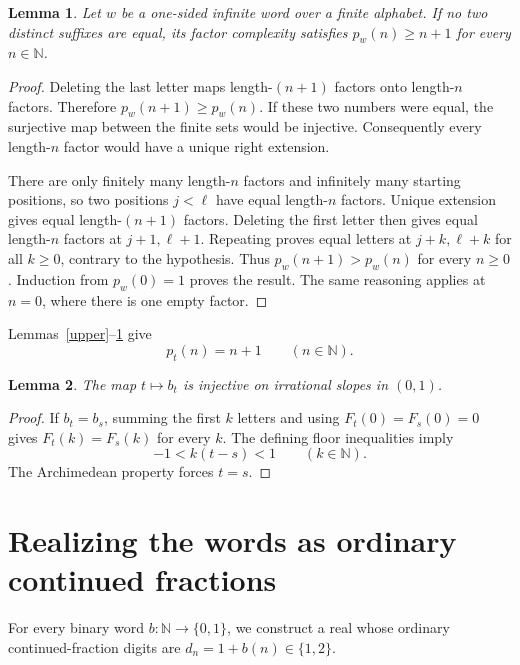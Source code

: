 \documentclass[11pt]{article}
\newtheorem{lemma}{Lemma}
\newcommand{\N}{\mathbb N}
\begin{document}
\begin{lemma}\label{lower}
Let $w$ be a one-sided infinite word over a finite alphabet. If no two distinct suffixes are equal, its factor complexity satisfies $p_w(n)\geq n+1$ for every $n\in\N$.
\end{lemma}
\begin{proof}
Deleting the last letter maps length-$(n+1)$ factors onto length-$n$ factors. Therefore $p_w(n+1)\geq p_w(n)$. If these two numbers were equal, the surjective map between the finite sets would be injective. Consequently every length-$n$ factor would have a unique right extension.

There are only finitely many length-$n$ factors and infinitely many starting positions, so two positions $j<\ell$ have equal length-$n$ factors. Unique extension gives equal length-$(n+1)$ factors. Deleting the first letter then gives equal length-$n$ factors at $j+1,\ell+1$. Repeating proves equal letters at $j+k,\ell+k$ for all $k\geq0$, contrary to the hypothesis. Thus $p_w(n+1)>p_w(n)$ for every $n\geq0$. Induction from $p_w(0)=1$ proves the result. The same reasoning applies at $n=0$, where there is one empty factor.
\end{proof}

Lemmas~\ref{upper}--\ref{lower} give
\begin{equation}\label{complexity}
 p_t(n)=n+1\qquad(n\in\N).
\end{equation}

\begin{lemma}\label{injective}
The map $t\mapsto b_t$ is injective on irrational slopes in $(0,1)$.
\end{lemma}
\begin{proof}
If $b_t=b_s$, summing the first $k$ letters and using $F_t(0)=F_s(0)=0$ gives $F_t(k)=F_s(k)$ for every $k$. The defining floor inequalities imply
\[
 -1<k(t-s)<1\qquad(k\in\N).
\]
The Archimedean property forces $t=s$.
\end{proof}

\section{Realizing the words as ordinary continued fractions}
For every binary word $b:\N\to\{0,1\}$, we construct a real whose ordinary continued-fraction digits are $d_n=1+b(n)\in\{1,2\}$.
\end{document}
